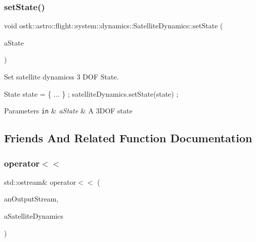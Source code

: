 \subsubsection{\texorpdfstring{set\+State()}{setState()}}
{\footnotesize\ttfamily void ostk\+::astro\+::flight\+::system\+::dynamics\+::\+Satellite\+Dynamics\+::set\+State (\begin{DoxyParamCaption}\item[{const \hyperlink{classostk_1_1astro_1_1trajectory_1_1_state}{State} \&}]{a\+State }\end{DoxyParamCaption})}



Set satellite dynamics\textquotesingle{}s 3 D\+OF State. 


\begin{DoxyCode}
State state = \{ ... \} ;
satelliteDynamics.setState(state) ;
\end{DoxyCode}
 
\begin{DoxyParams}[1]{Parameters}
\mbox{\tt in}  & {\em a\+State} & A 3\+D\+OF state \\
\hline
\end{DoxyParams}


\subsection{Friends And Related Function Documentation}
\mbox{\label{classostk_1_1astro_1_1flight_1_1system_1_1dynamics_1_1_satellite_dynamics_a26dfc3296b117e4887b254e5746b51bb}} 
\subsubsection{\texorpdfstring{operator$<$$<$}{operator<<}}
{\footnotesize\ttfamily std\+::ostream\& operator$<$$<$ (\begin{DoxyParamCaption}\item[{std\+::ostream \&}]{an\+Output\+Stream,  }\item[{const \hyperlink{classostk_1_1astro_1_1flight_1_1system_1_1dynamics_1_1_satellite_dynamics}{Satellite\+Dynamics} \&}]{a\+Satellite\+Dynamics }\end{DoxyParamCaption})\hspace{0.3cm}{\ttfamily [friend]}}



